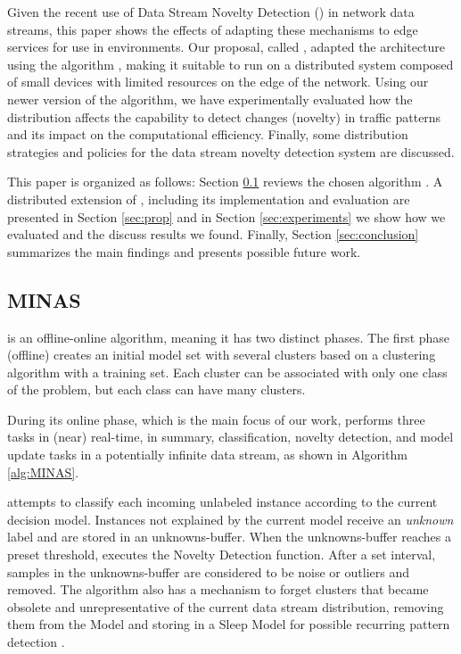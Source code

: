 Given the recent \cite{Viegas2019,AndreoniLopez2019,DaCosta2019a} use of Data Stream Novelty
Detection (\nd) in network data streams, this paper shows the effects of
adapting these mechanisms to edge services for use in \iot environments.
Our proposal, called \mfog, adapted the \arch
architecture \cite{Cassales2019a} using the \nd algorithm \minas
\cite{Faria2013Minas,Faria2015minas}, making it suitable to run
on a distributed system composed of small devices with limited
resources on the edge of the network.
Using our newer version of the \minas algorithm, we have experimentally evaluated 
how the distribution 
affects the capability to detect changes (novelty) in
traffic patterns and its impact on the computational efficiency.
Finally, some distribution strategies and policies for the data stream
novelty detection system are discussed.

This paper is organized as follows:
Section \ref{sec:minas} reviews the chosen \nd algorithm \minas.
A distributed extension of \minas, including its
implementation and evaluation are presented in Section \ref{sec:prop}
and in Section \ref{sec:experiments} we show how we evaluated \mfog and
the discuss results we found.
Finally, Section \ref{sec:conclusion} summarizes the main findings and presents
possible future work.

\subsection{MINAS}
\label{sec:minas}

\minas \cite{Faria2013Minas,Faria2015minas} is an offline-online \nd algorithm,
meaning it has two distinct phases. The first phase (offline) creates an initial
model set with several clusters based on a clustering algorithm with a training
set.
Each cluster can be associated with only one class of the problem, but each
class can have many clusters.

During its online phase, which is the main focus of our work, \minas performs
three tasks in (near) real-time,
in summary,
classification, novelty detection, and model update tasks
in a potentially infinite data stream, as shown in Algorithm \ref{alg:MINAS}.

\minas attempts to classify each incoming unlabeled instance according to the
current decision model. Instances not explained by the current model
receive an \textit{unknown} label and are stored in an unknowns-buffer.
When the unknowns-buffer reaches a preset threshold, \minas executes the
Novelty Detection function.
After a set interval, samples in the unknowns-buffer are considered to be
noise or outliers and removed.
The algorithm also has a mechanism to forget clusters that became obsolete and
unrepresentative of the current data stream distribution, removing them from
the Model and storing in a Sleep Model for possible recurring pattern
detection \cite{Faria2015minas}.

